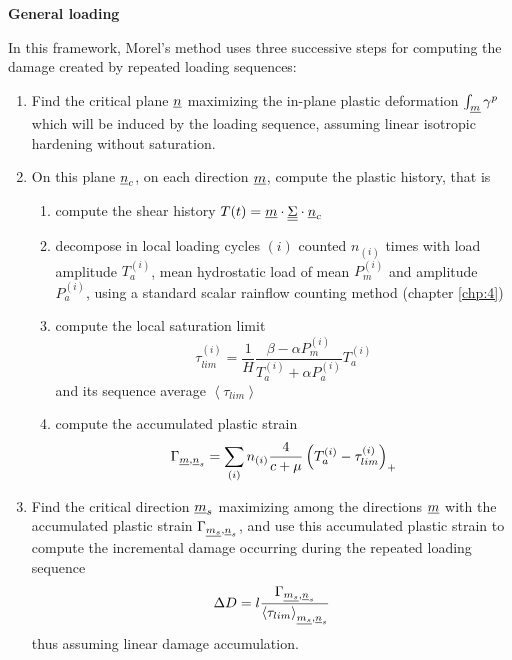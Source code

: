 \vspace{6pt}
\textbf{General loading}
\vspace{6pt}

 In this framework, Morel's method uses three successive steps for computing the damage created by repeated loading sequences:

\begin{enumerate}
\item Find the critical plane $\uline{n}$ maximizing the in-plane plastic deformation $\int_{\uline{m}}\gamma^p$ which will be induced by the loading sequence, assuming linear isotropic hardening without saturation.
\item On this plane  $\uline{n}_c$, on each direction $\uline{m}$, compute the plastic history, that is
\begin{enumerate}
	\item compute the shear history $T(t)=\uline{m}\cdot \uline{\uline{\Sigma}}\cdot \uline{n}_c$
	\item decompose in local loading cycles $(i)$ counted $n_{(i)}$ times with load amplitude $T_a^{(i)}$, mean hydrostatic load of mean $P_m^{(i)}$ and amplitude $P_a^{(i)}$, using a standard scalar rainflow counting method (chapter \ref{chp:4})
	\item compute the local saturation limit $$\tau_{lim}^{(i)}=\frac{1}{H}\frac{\beta-\alpha P_m^{(i)}}{T_a^{(i)}+\alpha P_a^{(i)}}T_a^{(i)}$$ and its sequence average $\left\langle \tau_{lim} \right\rangle$ 
	\item compute the accumulated plastic strain 
	\begin{equation}
\Gamma_{\uline{m},\uline{n}_s}=\sum_{(i)}n_{(i)}\dfrac{4}{c+\mu}\left(T_a^{(i)}-\tau_{lim}^{(i)} \right)_+
\label{eq.morel_plastic}
	\end{equation}
\end{enumerate}
\item Find the critical direction $\uline{m}_s$ maximizing among the directions $\uline{m}$ with the accumulated plastic strain $\Gamma_{\uline{m_s},\uline{n}_s}$, and use this accumulated plastic strain to compute the incremental damage occurring during the repeated loading sequence
\begin{equation}\Delta D=l\dfrac{\Gamma_{\uline{m_s},\uline{n}_s}}{\left\langle \tau_{lim} \right\rangle_{\uline{m_s},\uline{n}_s}}
	\label{NFsimple}
\end{equation}
thus assuming linear damage accumulation.
\end{enumerate}

